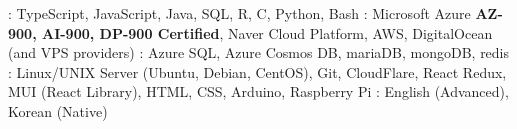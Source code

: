 

\begin{cvparagraph}
  \raggedright
  : TypeScript, JavaScript, Java, SQL, R, C, Python, Bash
  \linebreak
  : Microsoft Azure \textbf{AZ-900, AI-900, DP-900 Certified}, Naver Cloud Platform, AWS, DigitalOcean (and VPS providers)
  \linebreak
  : Azure SQL, Azure Cosmos DB, mariaDB, mongoDB, redis
  \linebreak
  : Linux/UNIX Server (Ubuntu, Debian, CentOS), Git, CloudFlare, React Redux, MUI (React Library), HTML, CSS, Arduino, Raspberry Pi
  \linebreak
  : English (Advanced), Korean (Native)
\end{cvparagraph}